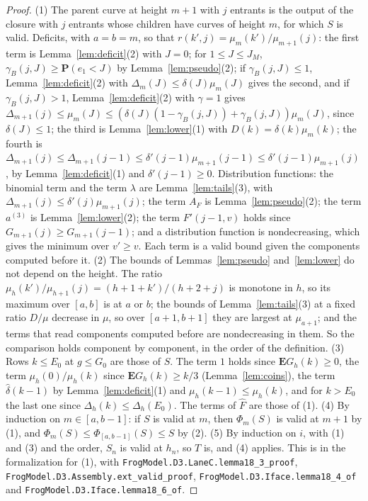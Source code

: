 \documentclass[11pt]{amsart}
\theoremstyle{definition}
\numberwithin{equation}{section}
\newcommand{\E}{\mathbf{E}}
\renewcommand{\P}{\mathbf{P}}
\begin{document}
\begin{proof}
(1) The parent curve at height $m+1$ with $j$ entrants is the output of the closure with $j$ entrants whose children have curves of height $m$, for which $S$ is valid. Deficits, with $a=b=m$, so that $r(k',j)=\mu_m(k')/\mu_{m+1}(j)$: the first term is Lemma~\ref{lem:deficit}(2) with $J=0$; for $1\le J\le J_M$, $\gamma_B(j,J)\ge\P(e_1<J)$ by Lemma~\ref{lem:pseudo}(2); if $\gamma_B(j,J)\le1$, Lemma~\ref{lem:deficit}(2) with $\Delta_m(J)\le\delta(J)\mu_m(J)$ gives the second, and if $\gamma_B(j,J)>1$, Lemma~\ref{lem:deficit}(2) with $\gamma=1$ gives $\Delta_{m+1}(j)\le\mu_m(J)\le(\delta(J)(1-\gamma_B(j,J))+\gamma_B(j,J))\mu_m(J)$, since $\delta(J)\le1$; the third is Lemma~\ref{lem:lower}(1) with $D(k)=\delta(k)\mu_m(k)$; the fourth is $\Delta_{m+1}(j)\le\Delta_{m+1}(j-1)\le\delta'(j-1)\mu_{m+1}(j-1)\le\delta'(j-1)\mu_{m+1}(j)$, by Lemma~\ref{lem:deficit}(1) and $\delta'(j-1)\ge0$. Distribution functions: the binomial term and the term $\lambda$ are Lemma~\ref{lem:tails}(3), with $\Delta_{m+1}(j)\le\delta'(j)\mu_{m+1}(j)$; the term $A_F$ is Lemma~\ref{lem:pseudo}(2); the term $a^{(3)}$ is Lemma~\ref{lem:lower}(2); the term $F'(j-1,v)$ holds since $G_{m+1}(j)\ge G_{m+1}(j-1)$; and a distribution function is nondecreasing, which gives the minimum over $v'\ge v$. Each term is a valid bound given the components computed before it. (2) The bounds of Lemmas~\ref{lem:pseudo} and~\ref{lem:lower} do not depend on the height. The ratio $\mu_h(k')/\mu_{h+1}(j)=(h+1+k')/(h+2+j)$ is monotone in $h$, so its maximum over $[a,b]$ is at $a$ or $b$; the bounds of Lemma~\ref{lem:tails}(3) at a fixed ratio $D/\mu$ decrease in $\mu$, so over $[a+1,b+1]$ they are largest at $\mu_{a+1}$; and the terms that read components computed before are nondecreasing in them. So the comparison holds component by component, in the order of the definition. (3) Rows $k\le E_0$ at $g\le G_0$ are those of $S$. The term $1$ holds since $\E G_h(k)\ge0$, the term $\mu_h(0)/\mu_h(k)$ since $\E G_h(k)\ge k/3$ (Lemma~\ref{lem:coins}), the term $\widehat\delta(k-1)$ by Lemma~\ref{lem:deficit}(1) and $\mu_h(k-1)\le\mu_h(k)$, and for $k>E_0$ the last one since $\Delta_h(k)\le\Delta_h(E_0)$. The terms of $\widehat F$ are those of (1). (4) By induction on $m\in[a,b-1]$: if $S$ is valid at $m$, then $\Phi_m(S)$ is valid at $m+1$ by (1), and $\Phi_m(S)\le\Phi_{[a,b-1]}(S)\le S$ by (2). (5) By induction on $i$, with (1) and (3) and the order, $S_n$ is valid at $h_n$, so $T$ is, and (4) applies. This is  in the formalization for (1), with \texttt{FrogModel.D3.LaneC.lemma18\_3\_proof}, \texttt{FrogModel.D3.Assembly.ext\_valid\_proof}, \texttt{FrogModel.D3.Iface.lemma18\_4\_of} and \texttt{FrogModel.D3.Iface.lemma18\_6\_of}.
\end{proof}
\end{document}
